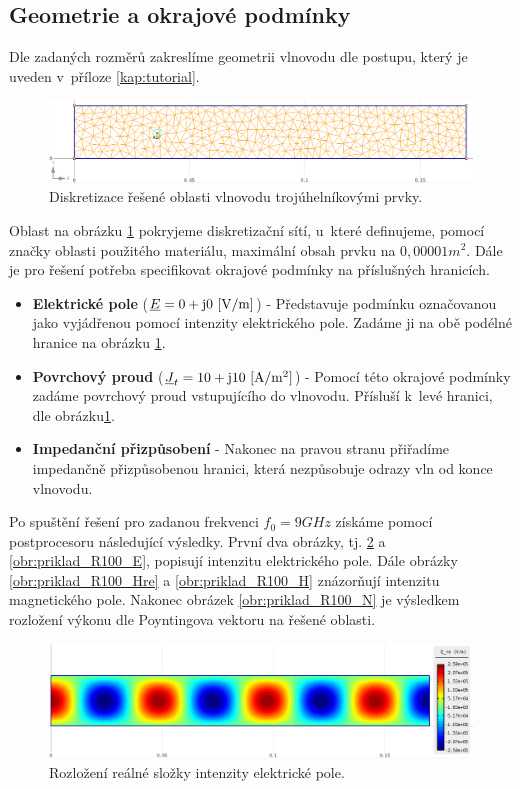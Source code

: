 \subsection*{Geometrie a okrajové podmínky}
Dle zadaných rozměrů zakreslíme geometrii vlnovodu dle postupu, který je uveden v~příloze \ref{kap:tutorial}. 
\begin{figure}[!h]
	\centering
	\includegraphics[width=15cm]{priklad_R100_diskretizace.png}
	\caption{Diskretizace řešené oblasti vlnovodu trojúhelníkovými prvky.}
	\label{obr:priklad_R100_diskretizace}
\end{figure}
Oblast na obrázku \ref{obr:priklad_R100_diskretizace} pokryjeme diskretizační sítí, u~které definujeme, pomocí značky oblasti použitého materiálu, maximální obsah prvku na $0,00001 \unit{m^{2}}$. Dále je pro řešení potřeba specifikovat okrajové podmínky na příslušných hranicích.
\begin{itemize}
\item {\bf Elektrické pole} (${\underline{E}} = 0 + \mathrm{j}0\mathrm{\ [V/m]}$) - Představuje podmínku označovanou jako  vyjádřenou pomocí intenzity elektrického pole. Zadáme ji na obě podélné hranice na obrázku \ref{obr:priklad_R100_diskretizace}.
\item {\bf Povrchový proud} (${\underline{J}}_{t} = 10 + \mathrm{j}10\mathrm{\ [A/m^{2}]}$) - Pomocí této okrajové podmínky zadáme povrchový proud vstupujícího do vlnovodu. Přísluší k~levé hranici, dle obrázku\ref{obr:priklad_R100_diskretizace}.
\item {\bf Impedanční přizpůsobení} - Nakonec na pravou stranu přiřadíme impedančně přizpůsobenou hranici, která nezpůsobuje odrazy vln od konce vlnovodu.
\end{itemize}
Po spuštění řešení pro zadanou frekvenci $f_0 = 9\unit{GHz}$ získáme pomocí postprocesoru následující výsledky. První dva obrázky, tj. \ref{obr:priklad_R100_Ere} a \ref{obr:priklad_R100_E}, popisují intenzitu elektrického pole. Dále obrázky \ref{obr:priklad_R100_Hre} a \ref{obr:priklad_R100_H} znázorňují intenzitu magnetického pole. Nakonec obrázek \ref{obr:priklad_R100_N} je výsledkem rozložení výkonu dle Poyntingova vektoru na řešené oblasti.
\begin{figure}[!h]
	\centering
	\includegraphics[width=15cm]{priklad_R100_Ere.png}
	\caption{Rozložení reálné složky intenzity elektrické pole.}
	\label{obr:priklad_R100_Ere}
\end{figure}

